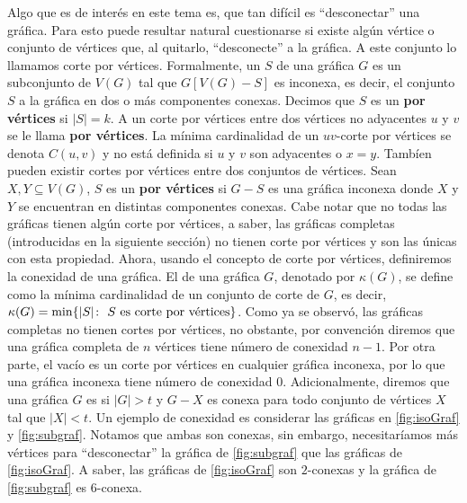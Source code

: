Algo que es de inter\'es en este tema es, que tan dif\'icil es ``desconectar''
una gr\'afica. Para esto puede resultar natural cuestionarse si existe alg\'un
v\'ertice o conjunto de v\'ertices que, al quitarlo, ``desconecte'' a la
gr\'afica. A este conjunto lo llamamos corte por v\'ertices. Formalmente, un
 $S$ de una gr\'afica $G$
es un subconjunto de $V(G)$ tal que $G[V(G)-S]$ es inconexa, es decir, el
conjunto $S$  a la gr\'afica en dos o m\'as componentes conexas.
Decimos que $S$ es un  \textbf{por v\'ertices} si
$|S|=k$. A un corte por v\'ertices entre dos v\'ertices no adyacentes $u$ y $v$
se le llama  \textbf{por
v\'ertices}. La m\'inima cardinalidad de un $uv$-corte por v\'ertices se denota
$C(u,v)$ y no est\'a definida si $u$ y $v$ son adyacentes o $x=y$. Tamb\'ien
pueden existir cortes por v\'ertices entre dos conjuntos de v\'ertices. Sean
$X,Y \subseteq V(G)$, $S$ es un  \textbf{por v\'ertices} si $G-S$ es una gr\'afica
inconexa donde $X$ y $Y$ se encuentran en distintas componentes conexas. Cabe
notar que no todas las gr\'aficas tienen alg\'un corte por v\'ertices, a saber,
las gr\'aficas completas (introducidas en la siguiente secci\'on) no tienen
corte por v\'ertices y son las \'unicas con esta propiedad. Ahora, usando el
concepto de corte por v\'ertices, definiremos la conexidad de una gr\'afica. El
 de una gr\'afica $G$, denotado por $\kappa(G)$,
se define como la m\'inima cardinalidad de un conjunto de corte de $G$, es
decir, $\kappa(G)=\min \{|S| \colon\ S \textnormal{ es corte por v\'ertices}\}$.
Como ya se observ\'o, las gr\'aficas completas no tienen cortes por v\'ertices,
no obstante, por convenci\'on diremos que una gr\'afica completa de $n$
v\'ertices tiene n\'umero de conexidad $n-1$. Por otra parte, el vac\'io es un
corte por v\'ertices en cualquier gr\'afica inconexa, por lo que una gr\'afica
inconexa tiene n\'umero de conexidad $0$. Adicionalmente, diremos que una
gr\'afica $G$ es  si $|G|>t$ y $G-X$ es conexa
para todo conjunto de v\'ertices $X$ tal que $|X|<t$. Un ejemplo de conexidad es
considerar las gr\'aficas en \cref{fig:isoGraf} y \cref{fig:subgraf}. Notamos
que ambas son conexas, sin embargo, necesitar\'iamos m\'as v\'ertices para
``desconectar'' la gr\'afica de \cref{fig:subgraf} que las gr\'aficas de
\cref{fig:isoGraf}. A saber, las gr\'aficas de \cref*{fig:isoGraf} son
$2$-conexas y la gr\'afica de \cref{fig:subgraf} es $6$-conexa.


